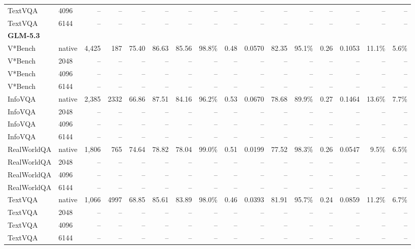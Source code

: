 \begin{table}[t]
\begin{tabular}{llrrrrrrrrrrrrrr}
TextVQA & 4096 & -- & -- & -- & -- & -- & -- & -- & -- & -- & -- & -- & -- & -- & -- \\
TextVQA & 6144 & -- & -- & -- & -- & -- & -- & -- & -- & -- & -- & -- & -- & -- & -- \\
\midrule
\multicolumn{10}{l}{\textbf{GLM-5.3}} \\
V*Bench & native & 4,425 & 187 & 75.40 & 86.63 & 85.56 & 98.8\% & 0.48 & 0.0570 & 82.35 & 95.1\% & 0.26 & 0.1053 & 11.1\% & 5.6\% \\
V*Bench & 2048 & -- & -- & -- & -- & -- & -- & -- & -- & -- & -- & -- & -- & -- & -- \\
V*Bench & 4096 & -- & -- & -- & -- & -- & -- & -- & -- & -- & -- & -- & -- & -- & -- \\
V*Bench & 6144 & -- & -- & -- & -- & -- & -- & -- & -- & -- & -- & -- & -- & -- & -- \\
InfoVQA & native & 2,385 & 2332 & 66.86 & 87.51 & 84.16 & 96.2\% & 0.53 & 0.0670 & 78.68 & 89.9\% & 0.27 & 0.1464 & 13.6\% & 7.7\% \\
InfoVQA & 2048 & -- & -- & -- & -- & -- & -- & -- & -- & -- & -- & -- & -- & -- & -- \\
InfoVQA & 4096 & -- & -- & -- & -- & -- & -- & -- & -- & -- & -- & -- & -- & -- & -- \\
InfoVQA & 6144 & -- & -- & -- & -- & -- & -- & -- & -- & -- & -- & -- & -- & -- & -- \\
RealWorldQA & native & 1,806 & 765 & 74.64 & 78.82 & 78.04 & 99.0\% & 0.51 & 0.0199 & 77.52 & 98.3\% & 0.26 & 0.0547 & 9.5\% & 6.5\% \\
RealWorldQA & 2048 & -- & -- & -- & -- & -- & -- & -- & -- & -- & -- & -- & -- & -- & -- \\
RealWorldQA & 4096 & -- & -- & -- & -- & -- & -- & -- & -- & -- & -- & -- & -- & -- & -- \\
RealWorldQA & 6144 & -- & -- & -- & -- & -- & -- & -- & -- & -- & -- & -- & -- & -- & -- \\
TextVQA & native & 1,066 & 4997 & 68.85 & 85.61 & 83.89 & 98.0\% & 0.46 & 0.0393 & 81.91 & 95.7\% & 0.24 & 0.0859 & 11.2\% & 6.7\% \\
TextVQA & 2048 & -- & -- & -- & -- & -- & -- & -- & -- & -- & -- & -- & -- & -- & -- \\
TextVQA & 4096 & -- & -- & -- & -- & -- & -- & -- & -- & -- & -- & -- & -- & -- & -- \\
TextVQA & 6144 & -- & -- & -- & -- & -- & -- & -- & -- & -- & -- & -- & -- & -- & -- \\
\bottomrule
\end{tabular}
\end{table}
